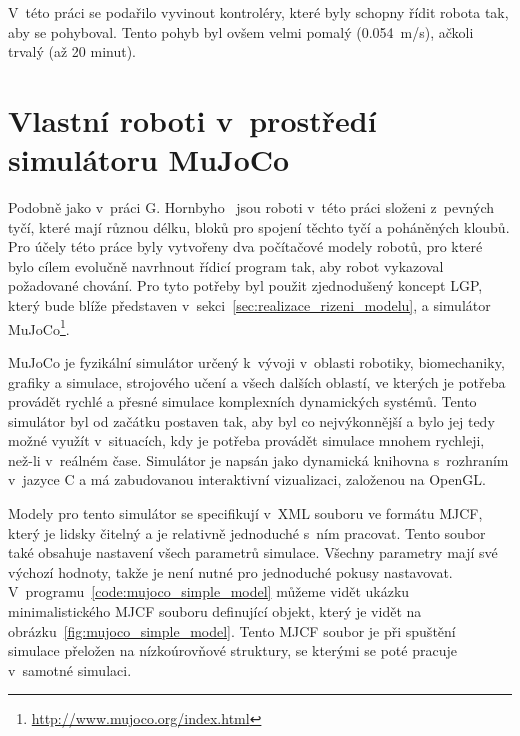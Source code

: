 V~této práci se podařilo vyvinout kontroléry, které byly schopny řídit robota tak, aby se pohyboval.
Tento pohyb byl ovšem velmi pomalý (0.054~m/s), ačkoli trvalý (až 20 minut).

\section{Vlastní roboti v~prostředí simulátoru MuJoCo}
\label{sec:vlastni_roboti}

Podobně jako v~práci G. Hornbyho~\cite{Hornby2003} jsou roboti v~této práci složeni z~pevných tyčí, které mají různou délku, bloků pro spojení těchto tyčí a poháněných kloubů.
Pro účely této práce byly vytvořeny dva počítačové modely robotů, pro které bylo cílem evolučně navrhnout řídicí program tak, aby robot vykazoval požadované chování.
Pro tyto potřeby byl použit zjednodušený koncept LGP, který bude blíže představen v~sekci~\ref{sec:realizace_rizeni_modelu}, a simulátor MuJoCo\footnote{\url{http://www.mujoco.org/index.html}}.

MuJoCo je fyzikální simulátor určený k~vývoji v~oblasti robotiky, biomechaniky, grafiky a simulace, strojového učení a všech dalších oblastí, ve kterých je potřeba provádět rychlé a přesné simulace komplexních dynamických systémů.
Tento simulátor byl od začátku postaven tak, aby byl co nejvýkonnější a bylo jej tedy možné využít v~situacích, kdy je potřeba provádět simulace mnohem rychleji, než-li v~reálném čase.
Simulátor je napsán jako dynamická knihovna s~rozhraním v~jazyce C a má zabudovanou interaktivní vizualizaci, založenou na OpenGL.

Modely pro tento simulátor se specifikují v~XML souboru ve formátu MJCF, který je lidsky čitelný a je relativně jednoduché s~ním pracovat.
Tento soubor také obsahuje nastavení všech parametrů simulace.
Všechny parametry mají své výchozí hodnoty, takže je není nutné pro jednoduché pokusy nastavovat.
V~programu~\ref{code:mujoco_simple_model} můžeme vidět ukázku minimalistického MJCF souboru definující objekt, který je vidět na obrázku~\ref{fig:mujoco_simple_model}.
Tento MJCF soubor je při spuštění simulace přeložen na nízkoúrovňové struktury, se kterými se poté pracuje v~samotné simulaci.



